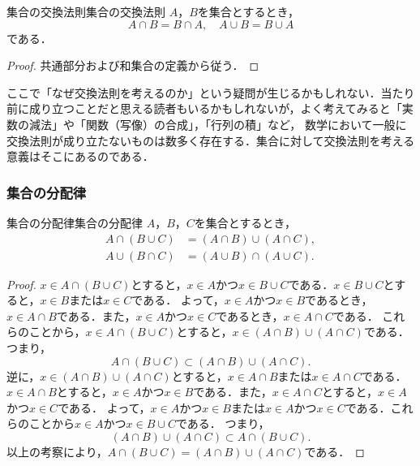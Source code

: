 \documentclass[a4paper,11pt]{ltjsarticle}
\newenvironment{tleftbar}{\begin{tbleftline}\setlength{\parindent}{1\zw}}{\end{tbleftline}}
\newcounter{mycolumn}
\begin{document}
        \begin{prop}{集合の交換法則}{集合の交換法則}
          $A$，$B$を集合とするとき，
          \[
          A \cap B = B \cap A , \quad A \cup B = B \cup A
          \]
          である．
        \end{prop}

        \begin{tleftbar}
        \begin{proof}
          共通部分および和集合の定義から従う．
        \end{proof}
      \end{tleftbar}

      \begin{mycolumn}
        ここで「なぜ交換法則を考えるのか」という疑問が生じるかもしれない．当たり前に成り立つことだと思える読者もいるかもしれないが，よく考えてみると「実数の減法」や「関数（写像）の合成」，「行列の積」など，
        数学において一般に交換法則が成り立たないものは数多く存在する．集合に対して交換法則を考える意義はそこにあるのである．
      \end{mycolumn}

        \subsubsection{集合の分配律}

        \begin{prop}{集合の分配律}{集合の分配律}
          $A$，$B$，$C$を集合とするとき，
          \begin{align*} 
            A \cap ( B \cup C) &= (A \cap B) \cup (A \cap C), \\
            A \cup ( B \cap C) &= (A \cup B) \cap (A \cup C).
          \end{align*}
        \end{prop}
        
        \begin{tleftbar}
        \begin{proof}
        $ x \in A \cap ( B \cup C)$とすると，$x \in A$かつ$x \in B \cup C$である．$x \in B \cup C$とすると，$x \in B$または$x \in C$である．
        よって，$x \in A$かつ$x \in B$であるとき，$x \in A \cap B$である．また，$x \in A$かつ$x \in C$であるとき，$x \in A \cap C$である．
        これらのことから，$x \in A \cap ( B \cup C)$とすると，$x \in (A \cap B) \cup (A \cap C)$である．
        つまり，
        \[
        A \cap ( B \cup C) \subset (A \cap B) \cup (A \cap C).
        \]
        逆に，$x \in (A \cap B) \cup (A \cap C)$とすると，$x \in A \cap B$または$x \in A \cap C$である．
        $x \in A \cap B$とすると，$x \in A$かつ$x \in B$である．また，$x \in A \cap C$とすると，$x \in A$かつ$x \in C$である．
        よって，$x \in A$かつ$x \in B$または$x \in A$かつ$x \in C$である．これらのことから$x \in A$かつ$x \in B \cup C$である．
        つまり，
        \[
        (A \cap B) \cup (A \cap C) \subset A \cap ( B \cup C).
        \]
        以上の考察により，$A \cap ( B \cup C) = (A \cap B) \cup (A \cap C)$である．
      \end{proof}
      \end{tleftbar}
        
\end{document}
